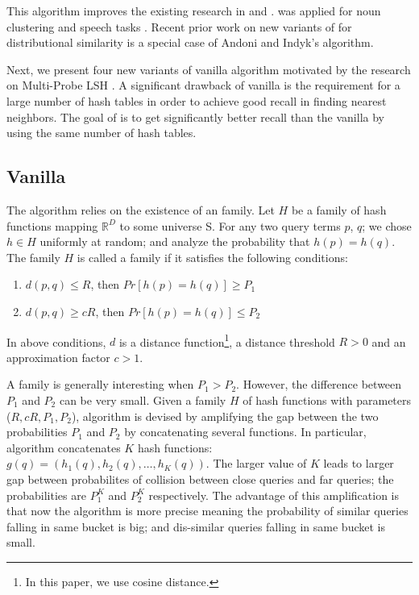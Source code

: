 This algorithm improves the existing research in \lsh and \plebf \cite{Indyk98STOC,Charikar02STOC}. 
\plebf was applied for noun clustering \cite{ravichandran05} and speech tasks \cite {JansenASRU11,JansenIS12}. 
Recent prior work on new variants of \plebf  \cite{goyal12Flag} for distributional similarity is a special case of Andoni and Indyk's \lsh algorithm. 

Next, we present four new variants of vanilla \lsh algorithm motivated by the research on Multi-Probe LSH \cite{LvVLDB07}. 
A significant drawback of vanilla \lsh is the requirement for a large number of hash tables in order to achieve good recall 
in finding nearest neighbors. 
The goal of  \mblshf is to get significantly better recall than the vanilla \lsh by using 
the same number of hash tables. 


\subsection{Vanilla \lsh}
\label{sec:vlsh}
The \lsh algorithm relies on the existence of an \lsh family. Let $H$ be a family of hash functions mapping 
 $\mathbb{R}^D$ to some universe S. For any two query terms $p$, $q$; we chose $h\in H$ uniformly at random; 
 and analyze the probability that $h(p) = h(q)$.  The family $H$ is called a \lsh family if 
 it satisfies the following conditions:

\begin{enumerate}
\item $d(p,q) \leq R$, then $Pr[h(p)=h(q)] \geq P_1$ 
\item $d(p,q) \geq cR$, then $Pr[h(p)=h(q)] \leq P_2$
\end{enumerate}

In above conditions, $d$ is a distance function\footnote{In this paper, we use cosine distance.}, 
a distance threshold $R>0$ and an approximation factor $c>1$.   

A family is generally interesting when  $P_1>P_2$. 
However, the difference between $P_1$ and $P_2$ can be very small. 
Given a family $H$ of hash functions with parameters ($R, cR, P_1,P_2$), 
\lsh algorithm is devised by amplifying the gap between 
the two probabilities $P_1$ and $P_2$ by concatenating several functions. 
In particular, \lsh algorithm concatenates $K$ hash functions: 
$g(q)=(h_1(q),h_2(q),\dots,h_K(q))$. 
The larger value of $K$ leads to larger 
gap between probabilites of collision between close queries and far queries; 
the probabilities are $P_1^{K}$ and $P_2^{K}$ respectively. 
The advantage of this amplification is that now the algorithm is more precise meaning 
the probability of similar queries falling in same bucket is big; 
and dis-similar queries falling in same bucket is small.  

